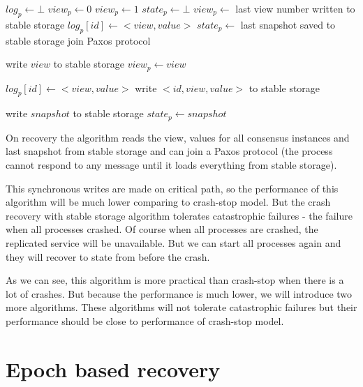 \begin{algorithmic}[1]
  \INIT{}
    \STATE $log_p \leftarrow \bot$ %
    \STATE $view_p \leftarrow 0$
      \STATE $view_p \leftarrow 1$
    \ENDIF
    \STATE $state_p \leftarrow \bot$ %
    \STATE
      \STATE $view_p \leftarrow$ last view number written to stable storage
        \STATE $log_p[id] \leftarrow <view, value>$
      \ENDFOR
      \STATE $state_p \leftarrow$ last snapshot saved to stable storage
    \ENDIF
    \STATE
    \STATE join Paxos protocol
  \ENDINIT

  \vspace{1em}
    \STATE write $view$ to stable storage
    \STATE $view_p \leftarrow view$
  \ENDPROC

  \vspace{1em}
    \STATE $log_p[id] \leftarrow <view, value>$
    \STATE write $<id, view, value>$ to stable storage
  \ENDPROC

  \vspace{1em}
    \STATE write $snapshot$ to stable storage
    \STATE $state_p \leftarrow snapshot$ 
  \ENDPROC
\end{algorithmic}

On recovery the algorithm reads the view, values for all consensus instances and last snapshot from stable storage and can join a Paxos protocol (the process cannot respond to any message until it loads everything from stable storage).

This synchronous writes are made on critical path, so the performance of this algorithm will be much lower comparing to crash-stop model. But the crash recovery with stable storage algorithm tolerates catastrophic failures - the failure when all processes crashed. Of course when all processes are crashed, the replicated service will be unavailable. But we can start all processes again and they will recover to state from before the crash.

As we can see, this algorithm is more practical than crash-stop when there is a lot of crashes. But because the performance is much lower, we will introduce two more algorithms. These algorithms will not tolerate catastrophic failures but their performance should be close to performance of crash-stop model.

\section{Epoch based recovery}
\label{sec:epoch_ss}

